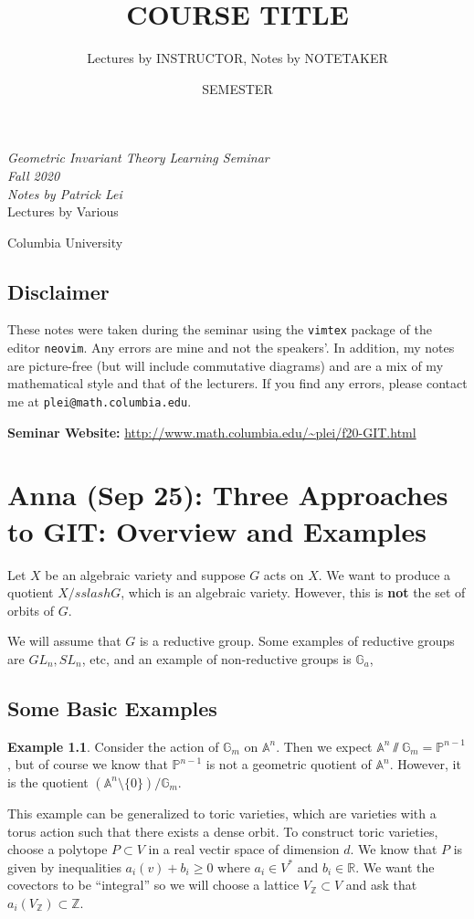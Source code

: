 \documentclass[leqno, openany]{memoir}
\title{COURSE TITLE}
\author{Lectures by INSTRUCTOR, Notes by NOTETAKER}
\date{SEMESTER}
\theoremstyle{definition}
\newtheorem{exm}[thm]{Example}
\theoremstyle{remark}
\theoremstyle{plain}
\theoremstyle{definition}
\theoremstyle{remark}
\newcommand{\A}{\mathbb{A}}
\newcommand{\R}{\mathbb{R}}
\newcommand{\Z}{\mathbb{Z}}
\renewcommand{\P}{\mathbb{P}}
\newcommand*{\titleSW}
    {\begingroup%
    \raggedleft
    \vspace*{\baselineskip}
    {\Huge\itshape Geometric Invariant Theory Learning Seminar \\ Fall 2020}\\[\baselineskip]
    {\large\itshape Notes by Patrick Lei}\\[0.2\textheight]
    {\Large Lectures by Various}\par
    \vfill
    {\Large \sffamily Columbia University}
    \vspace*{\baselineskip}
\endgroup}
\begin{document}
    
\begin{titlingpage}
\titleSW
\end{titlingpage}

\thispagestyle{empty}
\section*{Disclaimer}%
\label{sec:disclaimer}

These notes were taken during the seminar using the \texttt{vimtex} package of
the editor \texttt{neovim}.  Any errors are mine and not the speakers'.  In
addition, my notes are picture-free (but will include commutative diagrams) and
are a mix of my mathematical style and that of the lecturers.  If you find any
errors, please contact me at \texttt{plei@math.columbia.edu}.

\vspace*{1cm}

\noindent\textbf{Seminar Website:}
\url{http://www.math.columbia.edu/~plei/f20-GIT.html} \newpage


\tableofcontents

\chapter{Anna (Sep 25): Three Approaches to GIT: Overview and Examples}%
\label{cha:sep_25_anna_}

Let $X$ be an algebraic variety and suppose $G$ acts on $X$. We want to produce
a quotient $X /sslash G$, which is an algebraic variety. However, this is
\textbf{not} the set of orbits of $G$.

We will assume that $G$ is a reductive group. Some examples of reductive groups
are $GL_n, SL_n$, etc, and an example of non-reductive groups is
$\mathbb{G}_a$,

\section{Some Basic Examples}%

\begin{exm} Consider the action of $\mathbb{G}_m$ on $\A^n$. Then we expect
    $\A^n \sslash \mathbb{G}_m = \P^{n-1}$, but of course we know that
    $\P^{n-1}$ is not a geometric quotient of $\A^n$. However, it is the
    quotient $(\A^n \setminus \{0 \}) / \mathbb{G}_m$.  \end{exm}

This example can be generalized to toric varieties, which are varieties with a
torus action such that there exists a dense orbit. To construct toric
varieties, choose a polytope $P \subset V$ in a real vectir space of dimension
$d$. We know that $P$ is given by inequalities $a_i(v) + b_i \geq 0$ where $a_i
\in V^*$ and $b_i \in \R$. We want the covectors to be ``integral'' so we will
choose a lattice $V_{\Z} \subset V$ and ask that $a_i(V_{\Z}) \subset\Z$.
\end{document}
